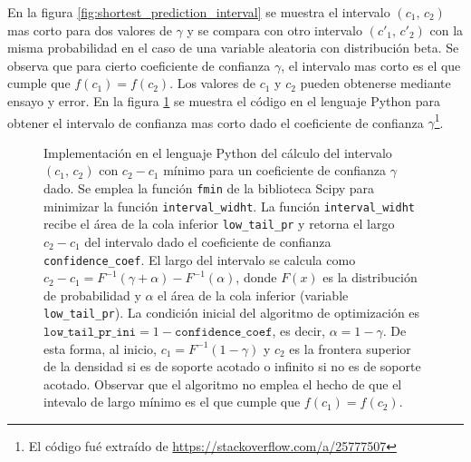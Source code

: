 \documentclass[a4paper]{report}
\begin{document}
En la figura \ref{fig:shortest_prediction_interval} se muestra el intervalo \((c_1,\,c_2)\) mas corto para dos valores de \(\gamma\) y se compara con otro intervalo \((c'_1,\,c'_2)\) con la misma probabilidad en el caso de una variable aleatoria con distribución beta. Se observa que para cierto coeficiente de confianza \(\gamma\), el intervalo mas corto es el que cumple que \(f(c_1)=f(c_2)\). Los valores de \(c_1\) y \(c_2\) pueden obtenerse mediante ensayo y error. En la figura \ref{fig:shortest_prediction_interval_code} se muestra el código en el lenguaje Python para obtener el intervalo de confianza mas corto dado el coeficiente de confianza \(\gamma\)\footnote{El código fué extraído de \url{https://stackoverflow.com/a/25777507}}.
\begin{figure}[!htb]
\begin{center}

\caption{\label{fig:shortest_prediction_interval_code} Implementación en el lenguaje Python del cálculo del intervalo \((c_1,\,c_2)\) con \(c_2-c_1\) mínimo para un coeficiente de confianza \(\gamma\) dado. Se emplea la función \texttt{fmin} de la biblioteca Scipy para minimizar la función \texttt{interval\_widht}. La función \texttt{interval\_widht} recibe el área de la cola inferior \texttt{low\_tail\_pr} y retorna el largo \(c_2-c_1\) del intervalo dado el coeficiente de confianza \texttt{confidence\_coef}. El largo del intervalo se calcula como \(c_2-c_1=F^{-1}(\gamma+\alpha)-F^{-1}(\alpha)\), donde \(F(x)\) es la distribución de probabilidad y \(\alpha\) el área de la cola inferior (variable \texttt{low\_tail\_pr}). La condición inicial del algoritmo de optimización es \(\texttt{low\_tail\_pr\_ini}=1-\texttt{confidence\_coef}\), es decir, \(\alpha=1-\gamma\). De esta forma, al inicio, \(c_1=F^{-1}(1-\gamma)\) y \(c_2\) es la frontera superior de la densidad si es de soporte acotado o infinito si no es de soporte acotado. Observar que el algoritmo no emplea el hecho de que el intevalo de largo mínimo es el que cumple que \(f(c_1)=f(c_2)\).}
\end{center}
\end{figure}                                                                                                                                                                                                                                                                                                                                                                                                                                                                                                                                                                                                                                                                                                                                                                                                                                                                                                                                                                                                                                                                                                                                                                           
\end{document}

